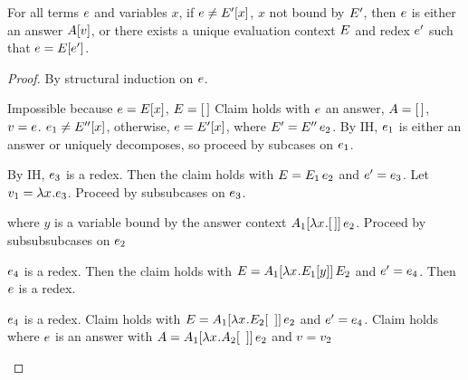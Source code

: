 \documentclass{article}
\begin{document}
\begin{lemma}
  For all terms $\e$ and variables $x$, if $\e \neq \Ex[']$, $x$ not bound by
  $\E'$, then $\e$ is either an answer $\Av$, or there exists a unique
  evaluation context $\E$ and \betaneednr redex $\e'$ such that $\e =
  \inE{\e'}$.
\end{lemma}
%
\begin{proof}
  By structural induction on $\e$.
\begin{byCases}
   Impossible because $\e = \Ex$, $\E = \hole$
  Claim holds with $\e$ an answer, $\A = \hole$, $\val = \e$.
  $\e_1 \neq \Ex['']$, otherwise, $\e = \Ex[']$, where $\E' = \ap{\E''}{\e_2}$.
  By IH, $\e_1$ is either an answer or uniquely decomposes, so
  proceed by subcases on $\e_1$.
  \begin{byCases}
    \renewcommand{\byCasesCaseTemplate}[1]{\textbf{Subcase {#1}.}}  
    By IH, $\e_3$ is a \betaneednr redex. Then the claim holds with 
    $\E = \ap{\E_1}{\e_2}$ and $\e' = \e_3$.
    Let $\val_1 = \lxe_3$. Proceed by subsubcases on $\e_3$.
    \begin{byCases}
      \renewcommand{\byCasesCaseTemplate}[1]{\textbf{Subsubcase {#1}.}}
      where $y$ is a variable bound by the answer context
      $\ap{\inA[_1]{\lx\hole}}{\e_2}$.
      Proceed by subsubsubcases on $\e_2$
      \begin{byCases}
        \renewcommand{\byCasesCaseTemplate}[1]{\textbf{Subsubsubcase {#1}.}}
        $\e_4$ is a \betaneednr redex. Then the claim holds with 
        $\E = \ap{\inA[_1]{\lx\Ey[_1]}}{\E_2}$ and $\e' = \e_4$.
        Then $\e$ is a \betaneednr redex.
      \end{byCases}
      $\e_4$ is a \betaneednr redex. 
      Claim holds with $\E = \ap{\inA[_1]{\lx\inE[_2]{\,\,\,}}}{\e_2}$ and 
      $\e' = \e_4$.
      Claim holds where $\e$ is an answer with 
      $\A = \ap{\inA[_1]{\lx\inA[_2]{\,\,\,}}}{\e_2}$ and $\val = \val_2$
    \end{byCases}
  \end{byCases}
\end{byCases}
\end{proof}
\end{document}
